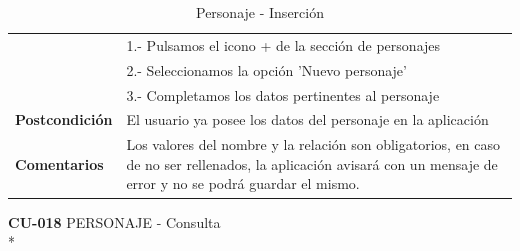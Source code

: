 \documentclass[../pfc.tex]{subfiles}
\begin{document}
\begin{table}[H]
\begin{tabular}[t]{|p{3cm}|p{9.5cm}|}
				& 1.- Pulsamos el icono + de la sección de personajes\\*	
				& 2.- Seleccionamos la opción 'Nuevo personaje'\\*
				& 3.- Completamos los datos pertinentes al personaje\\*
				\hline \textbf{Postcondición} & El usuario ya posee los datos del personaje  en la aplicación \\* 
				\hline \textbf{Comentarios}   & Los valores del nombre y la relación son obligatorios, en caso de no ser rellenados, la aplicación avisará con un mensaje de error y no se podrá guardar el mismo.\\*
				\hline
			\end{tabular}
			\caption{Personaje - Inserción}
			\label{tabla:caso017}
		\end{table}
		
		\clearpage
		
		\textbf{CU-018}	PERSONAJE - Consulta\\*
		
\end{document}
